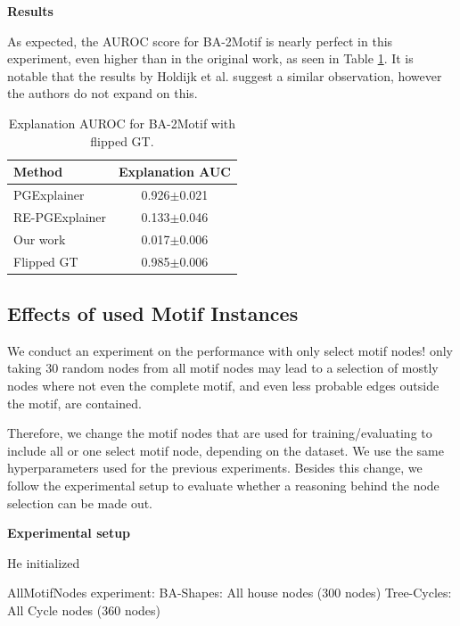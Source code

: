 \textbf{Results}

As expected, the AUROC score for BA-2Motif is nearly perfect in this experiment, even higher than in the original work, as seen in Table \ref{tab:flippedGT}. It is notable that the results by Holdijk et al. suggest a similar observation, however the authors do not expand on this.

\begin{table}[ht]
    \centering
    \scriptsize
    \begin{tabularx}{0.4\textwidth}{l c}
        \toprule
        \textbf{Method} & \textbf{Explanation AUC} \\
        \midrule
        PGExplainer       & 0.926$\pm$0.021 \\
        RE-PGExplainer       & 0.133$\pm$0.046 \\
        Our work       & 0.017$\pm$0.006 \\
        \midrule
        Flipped GT     & 0.985$\pm$0.006 \\
        \bottomrule
    \end{tabularx}
    \caption[Inductive performance on BA-2Motif with flipped ground truth]{Explanation AUROC for BA-2Motif with flipped GT.}
    \label{tab:flippedGT}
\end{table}

\subsection{Effects of used Motif Instances}
\label{sec:motif_set_experiment}

We conduct an experiment on the performance with only select motif nodes! only taking 30 random nodes from all motif nodes may lead to a selection of mostly nodes where not even the complete motif, and even less probable edges outside the motif, are contained.

Therefore, we change the motif nodes that are used for training/evaluating to include all or one select motif node, depending on the dataset. We use the same hyperparameters used for the previous experiments. Besides this change, we follow the experimental setup to evaluate whether a reasoning behind the node selection can be made out.

\textbf{Experimental setup}

He initialized

AllMotifNodes experiment:
BA-Shapes: All house nodes (300 nodes)
Tree-Cycles: All Cycle nodes (360 nodes)
\bigskip


